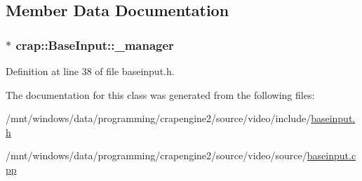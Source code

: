 \subsection{Member Data Documentation}
\hypertarget{classcrap_1_1_base_input_aaeaae2bbaa8ada09edec80dbe8872c38}{}
\subsubsection[{\+\_\+manager}]{$\ast$ crap\+::\+Base\+Input\+::\+\_\+manager\hspace{0.3cm}{\ttfamily [protected]}}\label{classcrap_1_1_base_input_aaeaae2bbaa8ada09edec80dbe8872c38}


Definition at line 38 of file baseinput.\+h.



The documentation for this class was generated from the following files\+:\begin{DoxyCompactItemize}
\item 
/mnt/windows/data/programming/crapengine2/source/video/include/\hyperlink{baseinput_8h}{baseinput.\+h}\item 
/mnt/windows/data/programming/crapengine2/source/video/source/\hyperlink{baseinput_8cpp}{baseinput.\+cpp}\end{DoxyCompactItemize}
